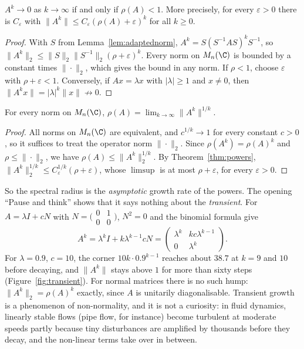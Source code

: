\begin{theorem}\label{thm:powers}
$A^k\to0$ as $k\to\infty$ if and only if $\rho(A)<1$. More precisely, for every $\varepsilon>0$ there is $C_\varepsilon$ with
$\|A^k\|\le C_\varepsilon(\rho(A)+\varepsilon)^k$ for all $k\ge0$.
\end{theorem}
\begin{proof}
With $S$ from Lemma~\ref{lem:adaptednorm}, $A^k=S(S^{-1}AS)^kS^{-1}$, so $\|A^k\|_2\le\|S\|_2\|S^{-1}\|_2(\rho+\varepsilon)^k$. Every norm on
$M_n(\C)$ is bounded by a constant times $\|\cdot\|_2$, which gives the bound in any norm. If $\rho<1$, choose $\varepsilon$ with
$\rho+\varepsilon<1$. Conversely, if $Ax=\lambda x$ with $|\lambda|\ge1$ and $x\ne0$, then $\|A^kx\|=|\lambda|^k\|x\|\not\to0$.
\end{proof}

\begin{theorem}\label{thm:gelfand}
For every norm on $M_n(\C)$, $\displaystyle\rho(A)=\lim_{k\to\infty}\|A^k\|^{1/k}$.
\end{theorem}
\begin{proof}
All norms on $M_n(\C)$ are equivalent, and $c^{1/k}\to1$ for every constant $c>0$, so it suffices to treat the operator norm
$\|\cdot\|_2$. Since $\rho(A^k)=\rho(A)^k$ and $\rho\le\|\cdot\|_2$, we have $\rho(A)\le\|A^k\|_2^{1/k}$. By Theorem~\ref{thm:powers},
$\|A^k\|_2^{1/k}\le C_\varepsilon^{1/k}(\rho+\varepsilon)$, whose $\limsup$ is at most $\rho+\varepsilon$, for every $\varepsilon>0$.
\end{proof}

So the spectral radius is the \emph{asymptotic} growth rate of the powers. The opening ``Pause and think'' shows that it says nothing
about the \emph{transient}. For $A=\lambda I+cN$ with $N=\bigl(\begin{smallmatrix}0&1\\0&0\end{smallmatrix}\bigr)$, $N^2=0$ and the
binomial formula give
\[
A^k=\lambda^kI+k\lambda^{k-1}cN=\begin{pmatrix}\lambda^k&kc\lambda^{k-1}\\0&\lambda^k\end{pmatrix}.
\]
For $\lambda=0.9$, $c=10$, the corner $10k\cdot0.9^{k-1}$ reaches about $38.7$ at $k=9$ and $10$ before decaying, and $\|A^k\|$ stays above
$1$ for more than sixty steps (Figure~\ref{fig:transient}). For normal matrices there is no such hump: $\|A^k\|_2=\rho(A)^k$ exactly,
since $A$ is unitarily diagonalisable. Transient growth is a phenomenon of non-normality, and it is not a curiosity: in fluid
dynamics, linearly stable flows (pipe flow, for instance) become turbulent at moderate speeds partly because tiny disturbances are
amplified by thousands before they decay, and the non-linear terms take over in between.

